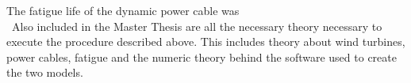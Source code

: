The fatigue life of the dynamic power cable was \\\
Also included in the Master Thesis are all the necessary theory necessary to execute the procedure described above. This includes theory about wind turbines, power cables, fatigue and the numeric theory behind the software used to create the two models. 

